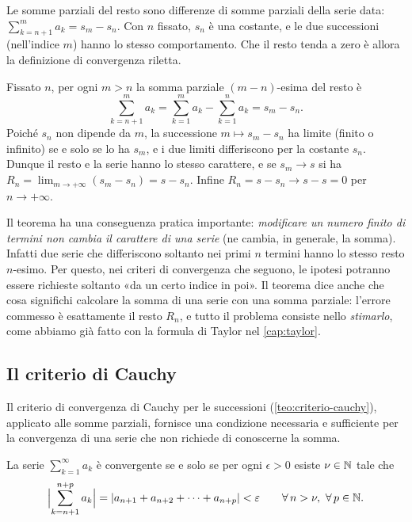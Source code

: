\begin{strategia}
Le somme parziali del resto sono differenze di somme parziali della serie data:
$\sum_{k=n+1}^{m}a_{k}=s_{m}-s_{n}$. Con $n$ fissato, $s_{n}$ è una costante, e le due successioni
(nell'indice $m$) hanno lo stesso comportamento. Che il resto tenda a zero è allora la
definizione di convergenza riletta.
\end{strategia}

\begin{dimostrazione}
Fissato $n$, per ogni $m>n$ la somma parziale $(m-n)$-esima del resto è
\[
  \sum_{k=n+1}^{m}a_{k}=\sum_{k=1}^{m}a_{k}-\sum_{k=1}^{n}a_{k}=s_{m}-s_{n} .
\]
Poiché $s_{n}$ non dipende da $m$, la successione $m\mapsto s_{m}-s_{n}$ ha limite (finito o
infinito) se e solo se lo ha $s_{m}$, e i due limiti differiscono per la costante $s_{n}$.
Dunque il resto e la serie hanno lo stesso carattere, e se $s_{m}\to s$ si ha
$R_{n}=\lim_{m\to+\infty}(s_{m}-s_{n})=s-s_{n}$. Infine $R_{n}=s-s_{n}\to s-s=0$ per $n\to+\infty$.
\end{dimostrazione}

Il teorema ha una conseguenza pratica importante: \emph{modificare un numero finito di
termini non cambia il carattere di una serie} (ne cambia, in generale, la somma). Infatti
due serie che differiscono soltanto nei primi $n$ termini hanno lo stesso resto
$n$-esimo. Per questo, nei criteri di convergenza che seguono, le ipotesi potranno essere
richieste soltanto «da un certo indice in poi». Il teorema dice anche che cosa significhi
calcolare la somma di una serie con una somma parziale: l'errore commesso è esattamente
il resto $R_{n}$, e tutto il problema consiste nello \emph{stimarlo}, come abbiamo già fatto
con la formula di Taylor nel \cref{cap:taylor}.

\subsection{Il criterio di Cauchy}

Il criterio di convergenza di Cauchy per le successioni (\cref{teo:criterio-cauchy}),
applicato alle somme parziali, fornisce una condizione necessaria e sufficiente per la
convergenza di una serie che non richiede di conoscerne la somma.

\begin{teorema}\label{teo:cauchy-serie}
La serie $\sum_{k=1}^{\infty}a_{k}$ è convergente se e solo se per ogni $\epsilon>0$ esiste
$\nu\in\mathbb{N}$ tale che
\begin{equation}\label{eq:cauchy-serie}
  \Bigl|\sum_{k=n+1}^{n+p}a_{k}\Bigr|=\lvert a_{n+1}+a_{n+2}+\dots+a_{n+p}\rvert<\varepsilon
  \qquad\forall\, n>\nu,\ \forall\, p\in\mathbb{N} .
\end{equation}
\end{teorema}

